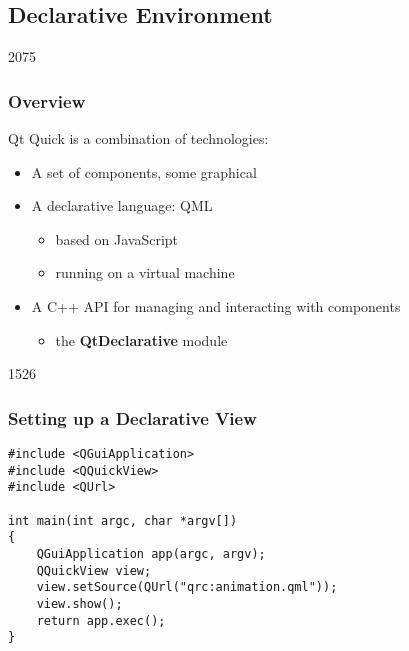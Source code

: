 %
%
%
%

\subsection{Declarative Environment}

\begin{slide}{2075}\frametitle{Overview}

Qt Quick is a combination of technologies:

\begin{itemize}
\item A set of components, some graphical
\item A declarative language: QML
  \begin{itemize}
  \item based on JavaScript
  \item running on a virtual machine
  \end{itemize}
\item A C++ API for managing and interacting with components
  \begin{itemize}
  \item the \textbf{QtDeclarative} module
  \end{itemize}
\end{itemize}

\end{slide}

\begin{slide}[fragile]{1526}\frametitle{Setting up a Declarative View}

\begin{lstlisting}
#include <QGuiApplication>
#include <QQuickView>
#include <QUrl>

int main(int argc, char *argv[])
{
    QGuiApplication app(argc, argv);
    QQuickView view;
    view.setSource(QUrl("qrc:animation.qml"));
    view.show();
    return app.exec();
}
\end{lstlisting}

\end{slide}

